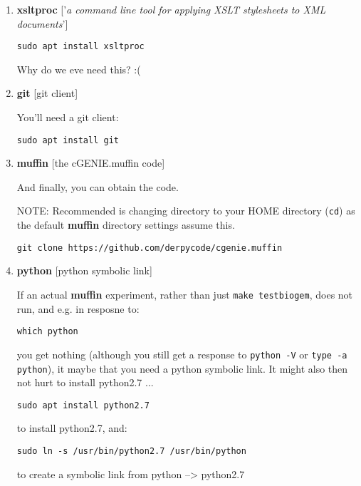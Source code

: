 \documentclass[11pt,fleqn]{book} %
\begin{document}
\begin{enumerate}[noitemsep]
['creates the necessary links and cache to the most recent shared libraries found in ... the file \texttt{/etc/ld.so.conf}, and in the trusted directories, \texttt{/lib} and \texttt{/usr/lib}']

\vspace{8pt}

\item \textbf{xsltproc} ['\textit{a command line tool for applying XSLT stylesheets to XML documents}']

\begin{verbatim}
sudo apt install xsltproc
\end{verbatim}

Why do we eve need this? :(

\vspace{4pt}
\item \textbf{git} [git client]

You'll need a git client:

\begin{verbatim}
sudo apt install git
\end{verbatim}

\item \textbf{muffin} [the cGENIE.muffin code]

And finally, you can obtain the code.

NOTE: Recommended is changing directory to your HOME directory (\texttt{cd}) as the default \textbf{muffin} directory settings assume this.

\begin{verbatim}
git clone https://github.com/derpycode/cgenie.muffin
\end{verbatim}

\vspace{4pt}
\item \textbf{python} [python symbolic link]

If an actual \textbf{muffin} experiment, rather than just \texttt{make testbiogem}, does not run, and e.g. in resposne to:

\begin{verbatim}
which python
\end{verbatim}

you get nothing (although you still get a response to \texttt{python -V} or \texttt{type -a python}), it maybe that you need a python symbolic link. It might also then not hurt to install python2.7 ...

\begin{verbatim}
sudo apt install python2.7
\end{verbatim}

to install python2.7, and:

\begin{verbatim}
sudo ln -s /usr/bin/python2.7 /usr/bin/python
\end{verbatim}

to create a symbolic link from python --> python2.7

\end{enumerate}
\end{document}
